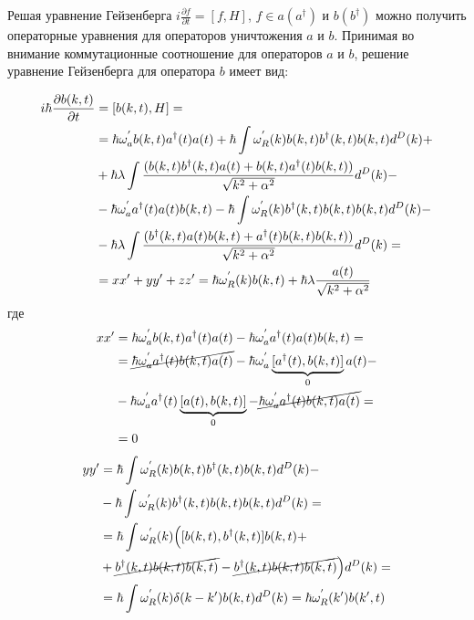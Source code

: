Решая уравнение Гейзенберга  $i\frac{\partial f}{\partial t}=[f,H]$, $ f \in a(a^{\dagger})$ и
$b(b^{\dagger})$ можно получить операторные уравнения для операторов уничтожения $a$ и $b$.
Принимая во внимание коммутационные соотношение для операторов $a$ и $b$, решение уравнение
Гейзенберга для оператора $b$ имеет вид:

\begin{equation}\notag
\begin{split}
    i \hbar \frac{\partial b(k,t)}{\partial t} & = [b(k,t), H] = \\
    & = \hbar \omega^{'}_a b(k,t) a^{\dagger}(t) a(t) + \hbar \int \omega^{'}_{R}(k) b(k,t) b^{\dagger}(k,t) b(k,t) d^{D}(k) + \\
    & + \hbar \lambda \int \frac{(b(k,t) b^{\dagger}(k,t) a(t) + b(k,t) a^{\dagger}(t) b(k,t))}{\sqrt{k^{2} + \alpha^{2}}} d^{D}(k) - \\
    & - \hbar \omega^{'}_a a^{\dagger}(t) a(t) b(k,t) - \hbar \int \omega^{'}_{R}(k) b^{\dagger}(k,t) b(k,t) b(k,t) d^{D}(k) - \\
    & - \hbar \lambda \int \frac{(b^{\dagger}(k,t) a(t) b(k,t) + a^{\dagger}(t) b(k,t) b(k,t))}{\sqrt{k^{2} + \alpha^{2}}} d^{D}(k) = \\
    & = xx' + yy' + zz' = \hbar \omega^{'}_{R}(k) b(k,t) + \hbar \lambda \frac{a(t)}{\sqrt{k^{2} + \alpha^{2}}}
\end{split}
\end{equation}
где
\begin{equation}\notag
\begin{split}
    xx' & = \hbar \omega^{'}_a b(k,t) a^{\dagger}(t) a(t) - \hbar \omega^{'}_a a^{\dagger}(t) a(t) b(k,t) = \\
    & = \cancel{\hbar \omega^{'}_a a^{\dagger}(t) b(k,t) a(t)} - \hbar \omega^{'}_a \underbrace{[a^{\dagger}(t), b(k,t)]}_{0} a(t) - \\
    & - \hbar \omega^{'}_a a^{\dagger}(t) \underbrace{[a(t), b(k,t)]}_{0} - \cancel{\hbar \omega^{'}_a a^{\dagger}(t) b(k,t) a(t)} = \\
    & = 0
\end{split}
\end{equation}
\begin{equation}\notag
\begin{split}
    yy' & = \hbar \int \omega^{'}_{R}(k) b(k,t) b^{\dagger}(k,t) b(k,t) d^{D}(k) - \\
    & - \hbar \int \omega^{'}_{R}(k) b^{\dagger}(k,t) b(k,t) b(k,t) d^{D}(k) = \\
    & = \hbar \int \omega^{'}_{R}(k) \Bigl([b(k,t), b^{\dagger}(k,t)] b(k,t) + \\
    & + \cancel{b^{\dagger}(k,t) b(k,t) b(k,t)} - \cancel{b^{\dagger}(k,t) b(k,t) b(k,t)} \Bigr) d^{D}(k) = \\
    & = \hbar \int \omega^{'}_{R}(k) \delta (k-k') b(k,t) d^{D}(k) = \hbar \omega^{'}_{R}(k') b(k',t)
\end{split}
\end{equation}
